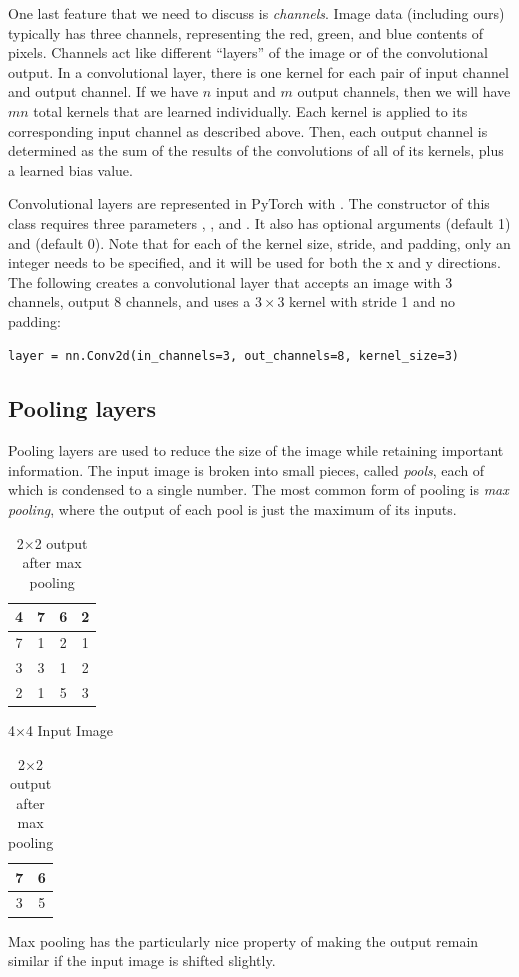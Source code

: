 One last feature that we need to discuss is \emph{channels}.
Image data (including ours) typically has three channels, representing the red, green, and blue contents of pixels.
Channels act like different ``layers'' of the image or of the convolutional output.
In a convolutional layer, there is one kernel for each pair of input channel and output channel.
If we have \(n\) input and \(m\) output channels, then we will have \(mn\) total kernels that are learned individually.
Each kernel is applied to its corresponding input channel as described above.
Then, each output channel is determined as the sum of the results of the convolutions of all of its kernels, plus a learned bias value.

Convolutional layers are represented in PyTorch with .
The constructor of this class requires three parameters , , and .
It also has optional arguments  (default 1) and  (default 0).
Note that for each of the kernel size, stride, and padding, only an integer needs to be specified, and it will be used for both the x and y directions.
The following creates a convolutional layer that accepts an image with 3 channels, output 8 channels, and uses a \(3\times 3\) kernel with stride 1 and no padding:
\begin{lstlisting}
layer = nn.Conv2d(in_channels=3, out_channels=8, kernel_size=3)
\end{lstlisting}


\subsection*{Pooling layers}

Pooling layers are used to reduce the size of the image while retaining important information.
The input image is broken into small pieces, called \emph{pools}, each of which is condensed to a single number.
The most common form of pooling is \emph{max pooling}, where the output of each pool is just the maximum of its inputs.

\begin{table}[H]
\parbox{.45\linewidth}{
\centering
\begin{tabular}{|c|c||c|c|}
\hline
4 & 7 & 6 & 2\\
\hline
7 & 1 & 2 & 1\\
\hline
\hline
3 & 3 & 1 & 2\\
\hline
2 & 1 & 5 & 3\\
\hline
\end{tabular}
\label{tab:input}
\caption*{4$\times$4 Input Image}
}
\hfill
\parbox{.45\linewidth}{
\centering
\begin{tabular}{|c|c|}
\hline
7 & 6\\
\hline
3 & 5\\
\hline
\end{tabular}
\label{tab:input}
\caption*{2$\times$2 output after max pooling}
}
\end{table}
Max pooling has the particularly nice property of making the output remain similar if the input image is shifted slightly.

